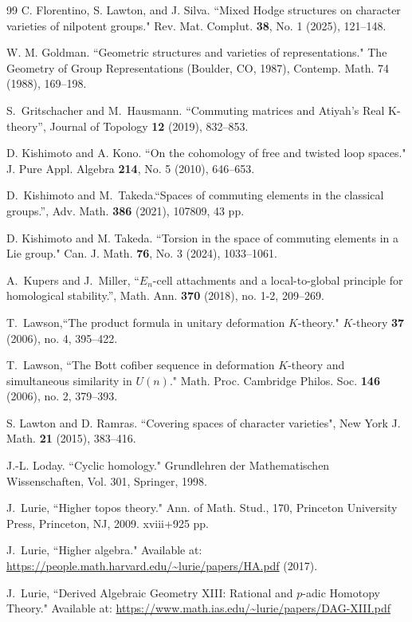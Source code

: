 \documentclass[oneside, a4paper, 12pt]{article}
\numberwithin{equation}{section}
\theoremstyle{plain}
\theoremstyle{definition}
\theoremstyle{remark}
\begin{document}
\begin{thebibliography}{99}
 C. Florentino, S. Lawton, and J. Silva. ``Mixed Hodge structures on character varieties of nilpotent groups." Rev. Mat. Complut. {\bf 38}, No. 1 (2025), 121--148.

 W. M. Goldman. ``Geometric structures and varieties of representations." The Geometry of Group Representations (Boulder, CO, 1987), Contemp. Math. 74 (1988), 169--198.

 S.~Gritschacher and M.~Hausmann. ``Commuting matrices and Atiyah's Real K-theory'', Journal of Topology {\bf 12} (2019), 832--853.

 D. Kishimoto and A. Kono. ``On the cohomology of free and twisted loop spaces." J. Pure Appl. Algebra {\bf 214}, No. 5 (2010), 646--653.

 D.~Kishimoto and M.~Takeda.``Spaces of commuting elements in the classical groups.'', Adv. Math. {\bf 386} (2021), 107809, 43 pp.

 D. Kishimoto and M. Takeda. ``Torsion in the space of commuting elements in a Lie group." Can. J. Math. {\bf 76}, No. 3 (2024), 1033--1061.

 A.~Kupers and J.~Miller, ``$E_n$-cell attachments and a local-to-global principle for homological stability.'', Math. Ann. {\bf 370} (2018), no. 1-2, 209--269.

 T.~Lawson,``The product formula in unitary deformation $K$-theory." $K$-theory {\bf 37} (2006), no. 4, 395--422.

 T.~Lawson, ``The Bott cofiber sequence in deformation $K$-theory and simultaneous similarity in $U(n)$." Math. Proc. Cambridge Philos. Soc. {\bf 146} (2006), no. 2, 379--393.

 S. Lawton and D. Ramras. ``Covering spaces of character varieties", New York J. Math. {\bf 21} (2015), 383--416.

 J.-L. Loday. ``Cyclic homology." Grundlehren der Mathematischen Wissenschaften, Vol. 301, Springer, 1998.

 J.~Lurie, ``Higher topos theory." Ann. of Math. Stud., 170, Princeton University Press, Princeton, NJ, 2009. xviii+925 pp.

 J.~Lurie, ``Higher algebra." Available at: \url{https://people.math.harvard.edu/~lurie/papers/HA.pdf} (2017).

 J.~Lurie, ``Derived Algebraic Geometry XIII: Rational and $p$-adic Homotopy Theory." Available at: \url{https://www.math.ias.edu/~lurie/papers/DAG-XIII.pdf}


\end{thebibliography}
\end{document}
